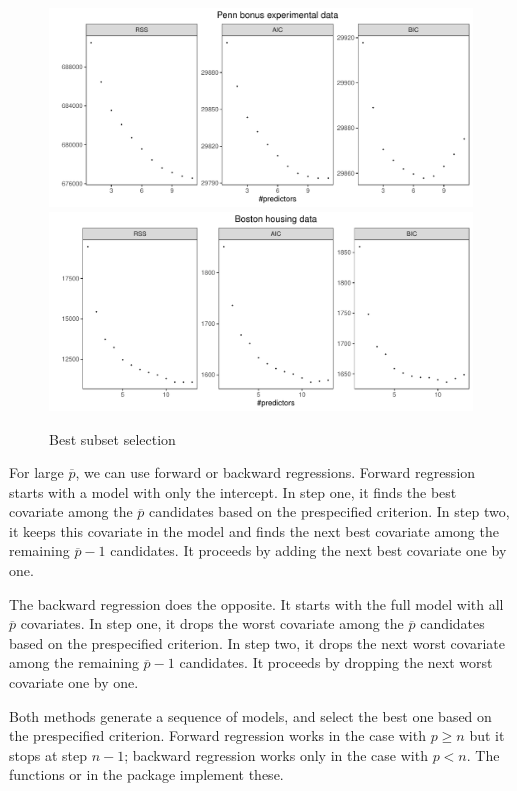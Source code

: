 \begin{figure}[ht]
\centering 
\includegraphics[width =  \textwidth]{figures/bestsubsetpenn}
\includegraphics[width = \textwidth]{figures/bestsubsetbostonhousing} 
\caption{Best subset selection}\label{fig::best-subset-selection-penn-boston}
\end{figure}

For large $\overline{p}$, we can use forward or backward regressions. 
Forward regression starts with a model with only the intercept. In step one, it finds the best covariate among the $\overline{p}$ candidates based on the prespecified criterion. In step two, it keeps this covariate in the model and finds the next best covariate among the remaining $\overline{p} - 1$ candidates. It proceeds by adding the next best covariate one by one. 


The backward regression does the opposite. It starts with the full model with all $\overline{p}$ covariates. In step one, it drops the worst covariate among the $\overline{p}$ candidates based on the prespecified criterion. In step two, it drops the next worst covariate among the remaining $\overline{p} - 1$ candidates. It proceeds by dropping the next worst covariate one by one. 


Both methods generate a sequence of models, and select the best one based on the prespecified criterion. Forward regression works in the case with $p\geq n$ but it stops at step $n-1$; backward regression works only in the case with $p<n.$
The functions
 or  in the  package implement these. 

